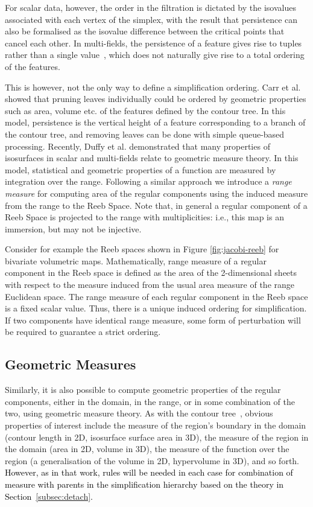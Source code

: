 \documentclass[twocolumn]{article}
\newcommand{\figref}[1]{Figure \ref{fig:#1}}
\begin{document}
For scalar data, however, the order in the filtration is dictated by the isovalues associated with
each vertex of the simplex, with the result that persistence can also be formalised as the isovalue
difference between the critical points that cancel each other.  In multi-fields, the persistence of 
a feature gives rise to tuples rather than a single value~\cite{Carlsson-MultiVariatePersistence},
which does not naturally give rise to a total ordering of the features.


This is however, not the only way to define a simplification ordering.
Carr et al. \cite{CSv10} 
showed that pruning leaves individually could be ordered by geometric properties such as area, 
volume etc. of the features defined by the contour tree. In this model, persistence is the vertical
height of a feature corresponding to a branch of the contour tree, and removing leaves can be done
with simple queue-based processing.
Recently, Duffy et al. \cite{DCM13} demonstrated that many properties of isosurfaces in scalar 
and multi-fields relate to geometric measure theory. In this model, statistical and geometric 
properties of a function are measured by integration over the range.
Following a similar approach we introduce a \emph{range measure} for
computing area of the regular components using the induced measure
from the range to the  Reeb Space. Note that, in general a regular component of a Reeb Space
is projected to the range with multiplicities: i.e., this map is an
immersion, but may not be injective.


Consider for example the Reeb spaces shown in \figref{jacobi-reeb} for bivariate volumetric 
maps. Mathematically, range measure of a regular component in the Reeb space  is
defined as the area of the 2-dimensional sheets with respect to the measure induced from the usual
area measure of the range Euclidean space. 
The range measure of each regular component in the Reeb space is a fixed scalar value. Thus,
there is a unique induced ordering for simplification. If two 
components have identical range measure, some form of perturbation will be required to guarantee a 
strict ordering. 





\subsection{Geometric Measures}
\label{sec:geomMeasures}
Similarly, it is also possible to compute geometric properties of the regular components, either
in the domain, in the range, or in some combination of the two, using
geometric measure theory. 
As with the contour tree~\cite{CSv10}, obvious properties of interest include the measure of the 
region's boundary in the domain (contour length in 2D, isosurface surface area in 3D), the measure
of the region in the domain (area in 2D, volume in 3D), the measure of the function over the region 
(a generalisation of the volume in 2D, hypervolume in 3D), and so forth.  \textcolor{black}{However, as in that work, 
rules will be needed in each case for combination of measure with parents in the simplification 
hierarchy based on the theory in Section~\ref{subsec:detach}.}  
\end{document}
